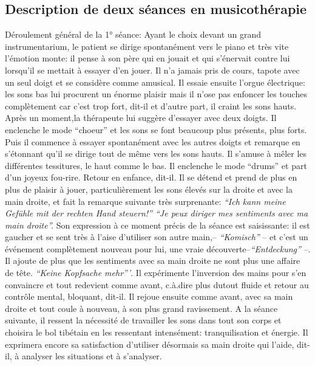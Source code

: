 	
 	\subsection{Description de deux  séances en musicothérapie}
 	Déroulement général de la 1° séance: 
Ayant le choix devant un grand instrumentarium,
        le patient se dirige spontanément vers le piano et très vite
        l'émotion monte: il pense à son père qui en jouait et qui
        s'énervait contre lui lorsqu'il se mettait  à essayer d'en
        jouer. Il n'a jamais pris de cours, tapote avec un seul doigt et se considère comme
        amusical. Il essaie ensuite l'orgue électrique: les sons bas
        lui procurent un énorme plaisir mais il n'ose pas enfoncer les touches
        complètement car c'est trop fort, dit-il et d'autre part, il craint les
        sons hauts.
        Après un moment,la thérapeute lui suggère d'essayer avec deux doigts.
        Il enclenche le mode ``choeur'' et les sons se font beaucoup
        plus présents, plus forts. Puis il commence à essayer spontanément
        avec les autres doigts et remarque en s'étonnant qu'il se
        dirige tout de même vers les sons
        hauts. Il s'amuse à mêler les différentes tessitures,
        le haut comme le bas.
        Il enclenche le mode ``drums'' et part d'un joyeux
        fou-rire. Retour en enfance, dit-il.
        Il se détend et prend de plus en plus de plaisir à jouer, particulièrement  les sons élevés
        sur la droite et avec la main droite, et fait
        la remarque suivante très surprenante:
        \textit{``Ich kann meine Gefühle mit der rechten Hand steuern!''
        ``Je peux diriger mes sentiments avec ma main droite''.}
 Son expression à ce moment précis de la séance est saisissante: il
        est gaucher et se sent très à l'aise d'utiliser son autre
        main,-- \textit{``Komisch''} -- et c'est un événement complètement nouveau pour lui, une vraie
        découverte--\textit{``Entdeckung''} --.
        Il ajoute de plus que les sentiments avec sa main
        droite ne sont plus une affaire de tête. \textit{``Keine
        Kopfsache mehr'''}. Il expérimente l'inversion des mains pour s'en convaincre et tout redevient comme
        avant, c.à.dire plus dutout fluide et retour au contrôle
        mental, 
        bloquant, dit-il. Il rejoue ensuite comme avant, avec sa main droite et tout
        coule à nouveau, à son plus grand ravissement.
        A la séance suivante, il ressent la nécessité de travailler
        les sons dans tout son corps et choisira le bol tibétain en
        les 
        ressentant intensément: tranquilisation et
        énergie. Il
        exprimera encore sa satisfaction d'utiliser désormais  sa main
        droite qui l'aide, dit-il, à analyser les
        situations et à 
        s'analyser.

